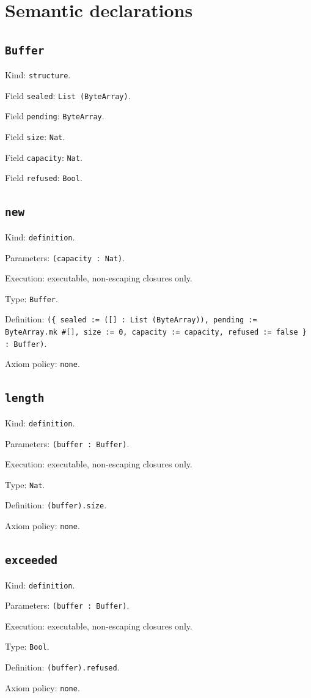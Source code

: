 \documentclass[11pt]{article}
\begin{document}
\section*{Semantic declarations}
\subsection*{\texttt{Buffer}}
\noindent Kind: \texttt{structure}.\par
\noindent Field \texttt{sealed}: \texttt{List (ByteArray)}.\par
\noindent Field \texttt{pending}: \texttt{ByteArray}.\par
\noindent Field \texttt{size}: \texttt{Nat}.\par
\noindent Field \texttt{capacity}: \texttt{Nat}.\par
\noindent Field \texttt{refused}: \texttt{Bool}.\par
\subsection*{\texttt{new}}
\noindent Kind: \texttt{definition}.\par
\noindent Parameters: \texttt{(capacity : Nat)}.\par
\noindent Execution: executable, non-escaping closures only.\par
\noindent Type: \texttt{Buffer}.\par
\noindent Definition: \texttt{(\{ sealed := ([] : List (ByteArray)), pending := ByteArray.mk \#[], size := 0, capacity := capacity, refused := false \} : Buffer)}.\par
\noindent Axiom policy: \texttt{none}.\par
\subsection*{\texttt{length}}
\noindent Kind: \texttt{definition}.\par
\noindent Parameters: \texttt{(buffer : Buffer)}.\par
\noindent Execution: executable, non-escaping closures only.\par
\noindent Type: \texttt{Nat}.\par
\noindent Definition: \texttt{(buffer).size}.\par
\noindent Axiom policy: \texttt{none}.\par
\subsection*{\texttt{exceeded}}
\noindent Kind: \texttt{definition}.\par
\noindent Parameters: \texttt{(buffer : Buffer)}.\par
\noindent Execution: executable, non-escaping closures only.\par
\noindent Type: \texttt{Bool}.\par
\noindent Definition: \texttt{(buffer).refused}.\par
\noindent Axiom policy: \texttt{none}.\par
\end{document}
